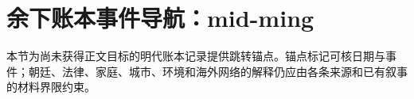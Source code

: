 \section{余下账本事件导航：mid-ming}

\label{sec:remaining-event-anchors-mid-ming}

本节为尚未获得正文目标的明代账本记录提供跳转锚点。锚点标记可核日期与事件；朝廷、法律、家庭、城市、环境和海外网络的解释仍应由各条来源和已有叙事的材料界限约束。
